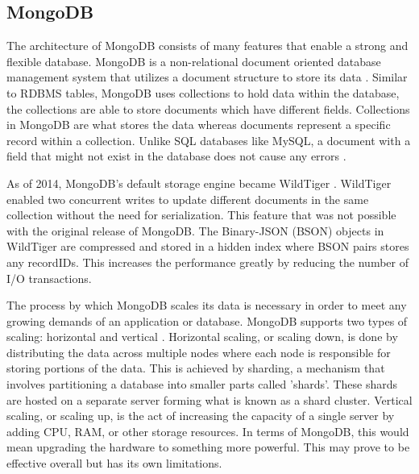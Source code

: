\documentclass[sigconf]{acmart}
\begin{document}
   \subsection{MongoDB}
   The architecture of MongoDB consists of many features that enable a strong and flexible database. MongoDB is a non-relational document oriented database management system that utilizes a document structure to store its data \cite{Geeks4geeksMongo}. Similar to RDBMS tables, MongoDB uses collections to hold data within the database, the collections are able to store documents which have different fields. Collections in MongoDB are what stores the data whereas documents represent a specific record within a collection. Unlike SQL databases like MySQL, a document with a field that might not exist in the database does not cause any errors \cite{Mongo-Medium}.
  
   As of 2014, MongoDB's default storage engine became WildTiger \cite{Mongo-Medium}. WildTiger enabled two concurrent writes to update different documents in the same collection without the need for serialization. This feature that was not possible with the original release of MongoDB. The Binary-JSON (BSON) objects in WildTiger are compressed and stored in a hidden index where BSON pairs stores any recordIDs. This increases the performance greatly by reducing the number of I/O transactions.


   The process by which MongoDB scales its data is necessary in order to meet any growing demands of an application or database. MongoDB supports two types of scaling: horizontal and vertical \cite{Mongo-scalability}. Horizontal scaling, or scaling down, is done by distributing the data across multiple nodes where each node is responsible for storing portions of the data. This is achieved by sharding, a mechanism that involves partitioning a database into smaller parts called 'shards'. These shards are hosted on a separate server forming what is known as a shard cluster. Vertical scaling, or scaling up, is the act of increasing the capacity of a single server by adding CPU, RAM, or other storage resources. In terms of MongoDB, this would mean upgrading the hardware to something more powerful. This may prove to be effective overall but has its own limitations.
  
\end{document}
